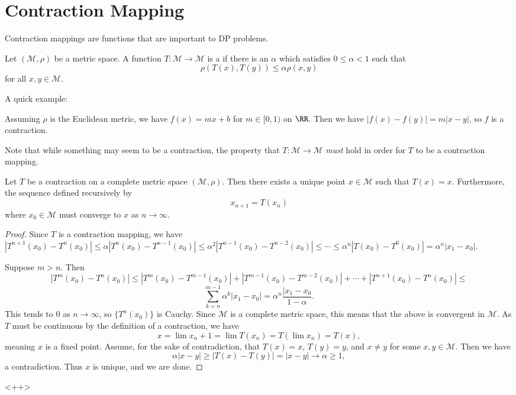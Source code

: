 \section{Contraction Mapping}
Contraction mappings are functions that are important to DP problems. 
\begin{definition}
	Let $(\mathcal{M}, \rho)$ be a metric space. A function $T: \mathcal{M} \to \mathcal{M}$ is a  if there is an $\alpha$ which satisfies $0 \leq \alpha < 1$ such that 
	\[ \rho(T(x), T(y)) \leq \alpha\rho(x,y) \] for all $x, y\in \mathcal{M}$. 
\end{definition}
A quick example:
\begin{example}
	Assuming $\rho$ is the Euclidean metric, we have $f(x) = mx + b$ for $m \in [0,1)$ on $\RR$. Then we have $|f(x) - f(y)| = m|x-y|$, so $f$ is a contraction. 
\end{example}

Note that while something may seem to be a contraction, the property that $T: \mathcal{M} \to \mathcal{M}$ \emph{must} hold in order for $T$ to be a contraction mapping. 

\begin{theorem}
	Let $T$ be a contraction on a complete metric space $(\mathcal{M}, \rho)$. Then there exists a unique point $x \in \mathcal{M}$ such that $T(x) = x$. Furthermore, the sequence defined recursively by 
	\[ x_{n+1} = T(x_n)\] where $x_0 \in \mathcal{M}$ must converge to $x$ as $n \to \infty$. 
\end{theorem}
\begin{proof}
	Since $T$ is a contraction mapping, we have $|T^{n+1}(x_0) - T^n(x_0)| \leq \alpha|T^n(x_0) - T^{n-1}(x_0)| \leq \alpha^2|T^{n-1}(x_0) - T^{n-2}(x_0)| \leq \cdots \leq \alpha^n|T(x_0) - T^0(x_0)| = \alpha^n|x_1 - x_0|$. 

	Suppose $m > n$. Then 
	\[ |T^m(x_0) - T^n(x_0)| \leq |T^m(x_0)- T^{m-1}(x_0)|  + |T^{m-1}(x_0) - T^{m-2}(x_0)| + \cdots + |T^{n+1}(x_0) - T^n(x_0)| \leq \]
	\[ \sum\limits_{k=n}^{m-1} \alpha^k |x_1 - x_0| = \alpha^n \dfrac{|x_1 - x_0}{1-\alpha}. \] This tends to 0 as $n \to \infty$, so $\{T^n(x_0)\}$ is Cauchy. Since $\mathcal{M}$ is a complete metric space, this means that the above is convergent in $\mathcal{M}$. As $T$ must be continuous by the definition of a contraction, we have 
	\[ x = \lim x_n+1 = \lim T(x_n) = T(\lim x_n) = T(x), \] meaning $x$ is a fixed point. Assume, for the sake of contradiction, that $T(x) = x$, $T(y) = y$, and $x \neq y$ for some $x, y \in\mathcal{M}$. Then we have 
	\[ \alpha|x-y| \geq |T(x) - T(y)| = |x-y| \rightarrow \alpha \geq 1, \] a contradiction. Thus $x$ is unique, and we are done. 
\end{proof}<++>

